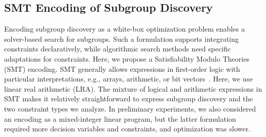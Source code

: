 \documentclass[acmsmall]{acmart} %
\theoremstyle{acmplain}
\theoremstyle{acmdefinition}
\begin{document}
\subsection{SMT Encoding of Subgroup Discovery}
\label{sec:csd:approach:smt}

Encoding subgroup discovery as a white-box optimization problem enables a solver-based search for subgroups.
Such a formulation supports integrating constraints declaratively, while algorithmic search methods need specific adaptations for constraints.
Here, we propose a Satisfiability Modulo Theories (SMT) encoding.
SMT generally allows expressions in first-order logic with particular interpretations, e.g., arrays, arithmetic, or bit vectors~\cite{barrett2018satisfiability}.
Here, we use linear real arithmetic (LRA).
The mixture of logical and arithmetic expressions in SMT makes it relatively straightforward to express subgroup discovery and the two constraint types we analyze.
In preliminary experiments, we also considered an encoding as a mixed-integer linear program, but the latter formulation required more decision variables and constraints, and optimization was slower.
\end{document}
